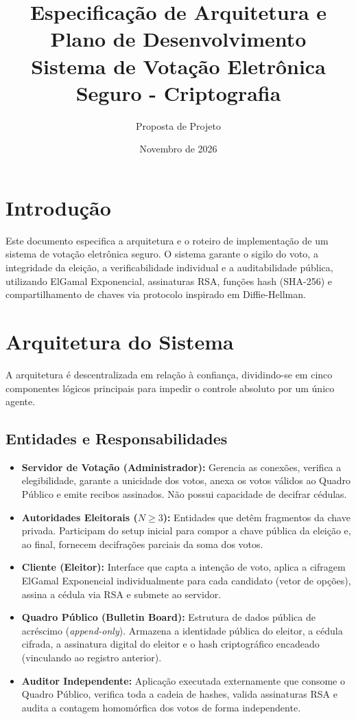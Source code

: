 \documentclass[12pt, a4paper]{article}
\title{\textbf{Especificação de Arquitetura e Plano de Desenvolvimento}\\
\large Sistema de Votação Eletrônica Seguro - Criptografia}
\author{Proposta de Projeto}
\date{Novembro de 2026}
\begin{document}
\maketitle

\section{Introdução}
Este documento especifica a arquitetura e o roteiro de implementação de um sistema de votação eletrônica seguro. O sistema garante o sigilo do voto, a integridade da eleição, a verificabilidade individual e a auditabilidade pública, utilizando ElGamal Exponencial, assinaturas RSA, funções hash (SHA-256) e compartilhamento de chaves via protocolo inspirado em Diffie-Hellman.

\section{Arquitetura do Sistema}

A arquitetura é descentralizada em relação à confiança, dividindo-se em cinco componentes lógicos principais para impedir o controle absoluto por um único agente.

\subsection{Entidades e Responsabilidades}
\begin{itemize}
    \item \textbf{Servidor de Votação (Administrador):} Gerencia as conexões, verifica a elegibilidade, garante a unicidade dos votos, anexa os votos válidos ao Quadro Público e emite recibos assinados. Não possui capacidade de decifrar cédulas.
    \item \textbf{Autoridades Eleitorais ($N \ge 3$):} Entidades que detêm fragmentos da chave privada. Participam do setup inicial para compor a chave pública da eleição e, ao final, fornecem decifrações parciais da soma dos votos.
    \item \textbf{Cliente (Eleitor):} Interface que capta a intenção de voto, aplica a cifragem ElGamal Exponencial individualmente para cada candidato (vetor de opções), assina a cédula via RSA e submete ao servidor.
    \item \textbf{Quadro Público (Bulletin Board):} Estrutura de dados pública de acréscimo (\textit{append-only}). Armazena a identidade pública do eleitor, a cédula cifrada, a assinatura digital do eleitor e o hash criptográfico encadeado (vinculando ao registro anterior).
    \item \textbf{Auditor Independente:} Aplicação executada externamente que consome o Quadro Público, verifica toda a cadeia de hashes, valida assinaturas RSA e audita a contagem homomórfica dos votos de forma independente.
\end{itemize}
\end{document}
